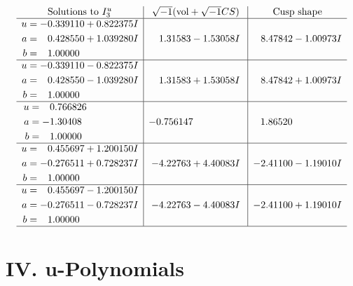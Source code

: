 \documentclass[1p]{elsarticle_modified}
\theoremstyle{definition}
\newcommand{\I}{\sqrt{-1}}
\begin{document}
$$\begin{array}{c|c|c}  
\text{Solutions to }I^u_{3}& \I (\text{vol} + \sqrt{-1}CS) & \text{Cusp shape}\\
 \hline 
\begin{aligned}
u &= -0.339110 + 0.822375 I \\
a &= \phantom{-}0.428550 + 1.039280 I \\
b &= \phantom{-}1.00000\phantom{ +0.000000I}\end{aligned}
 & \phantom{-}1.31583 - 1.53058 I & \phantom{-}8.47842 - 1.00973 I \\ \hline\begin{aligned}
u &= -0.339110 - 0.822375 I \\
a &= \phantom{-}0.428550 - 1.039280 I \\
b &= \phantom{-}1.00000\phantom{ +0.000000I}\end{aligned}
 & \phantom{-}1.31583 + 1.53058 I & \phantom{-}8.47842 + 1.00973 I \\ \hline\begin{aligned}
u &= \phantom{-}0.766826\phantom{ +0.000000I} \\
a &= -1.30408\phantom{ +0.000000I} \\
b &= \phantom{-}1.00000\phantom{ +0.000000I}\end{aligned}
 & -0.756147\phantom{ +0.000000I} & \phantom{-}1.86520\phantom{ +0.000000I} \\ \hline\begin{aligned}
u &= \phantom{-}0.455697 + 1.200150 I \\
a &= -0.276511 + 0.728237 I \\
b &= \phantom{-}1.00000\phantom{ +0.000000I}\end{aligned}
 & -4.22763 + 4.40083 I & -2.41100 - 1.19010 I \\ \hline\begin{aligned}
u &= \phantom{-}0.455697 - 1.200150 I \\
a &= -0.276511 - 0.728237 I \\
b &= \phantom{-}1.00000\phantom{ +0.000000I}\end{aligned}
 & -4.22763 - 4.40083 I & -2.41100 + 1.19010 I\\
 \hline 
 \end{array}$$\newpage
\newpage\renewcommand{\arraystretch}{1}
\centering \section*{ IV. u-Polynomials}
\end{document}
